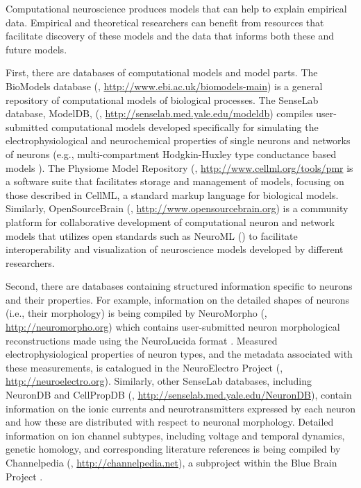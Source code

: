 \documentclass[12pt]{article}
\begin{document}
Computational neuroscience produces models that can help to explain empirical data. 
Empirical and theoretical researchers can benefit from resources that facilitate discovery of these models and the data that informs both these and future models.   

First, there are databases of computational models and model parts.  
The BioModels database (\cite{BioModels2010,BioModels2013}, \url{http://www.ebi.ac.uk/biomodels-main}) is a general repository of computational models of biological processes.  
The SenseLab database, ModelDB, (\cite{migliore_modeldb_2003}, \url{http://senselab.med.yale.edu/modeldb}) compiles user-submitted computational models developed specifically for simulating the electrophysiological and neurochemical properties of single neurons and networks of neurons (e.g., multi-compartment Hodgkin-Huxley type conductance based models \cite{hodgkin_quantitative_1952}). 
The Physiome Model Repository (\cite{physiomemodelrepository_2011}, \url{http://www.cellml.org/tools/pmr} is a software suite that facilitates storage and management of models, focusing on those described in CellML, a standard markup language for biological models. 
Similarly, OpenSourceBrain (\cite{OSB_2012}, \url{http://www.opensourcebrain.org}) is a community platform for collaborative development of computational neuron and network models that utilizes open standards such as NeuroML (\cite{gleeson_neuroml:_2010}) to facilitate interoperability and visualization of neuroscience models developed by different researchers. 

Second, there are databases containing structured information specific to neurons and their properties. 
For example, information on the detailed shapes of neurons (i.e., their morphology) is being compiled by NeuroMorpho (\cite{neuromorpho_2007}, \url{http://neuromorpho.org}) which contains user-submitted neuron morphological reconstructions made using the NeuroLucida format \cite{glaser_neuron_1990}. 
Measured electrophysiological properties of neuron types, and the metadata associated with these measurements, is catalogued in the NeuroElectro Project (\cite{neuroelectro_2013}, \url{http://neuroelectro.org}).  
Similarly, other SenseLab databases, including NeuronDB and CellPropDB (\cite{crasto_senselab:_2007}, \url{http://senselab.med.yale.edu/NeuronDB}), contain information on the ionic currents and neurotransmitters expressed by each neuron and how these are distributed with respect to neuronal morphology. 
Detailed information on ion channel subtypes, including voltage and temporal dynamics, genetic homology, and corresponding literature references is being compiled by Channelpedia (\cite{ranjan_channelpedia:_2011}, \url{http://channelpedia.net}), a subproject within the Blue Brain Project \citep{markram_blue_2006}. 
\end{document}
